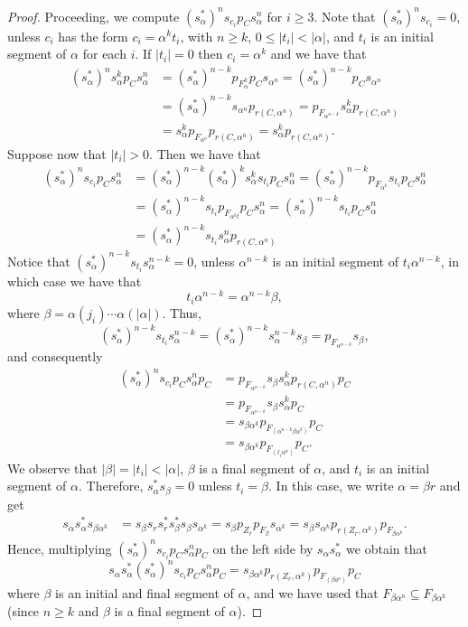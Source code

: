 \documentclass[a4paper,12pt]{amsart}
\theoremstyle{definition}
\theoremstyle{remark}
\numberwithin{equation}{section}
\begin{document}
\begin{proof}
Proceeding, we compute $(s_\alpha ^*)^ns_{c_i}p_C s_{\alpha}^n$ for $i\geq 3$. Note that $(s_\alpha ^*)^ns_{c_i}=0$, unless $c_i$ has the form $c_i=\alpha^k t_i$, with $n \geq k$, $0\leq |t_i|<|\alpha|$, and $t_i$ is an initial segment of $\alpha$ for each $i$. 
If $|t_i|=0$ then $c_i=\alpha^k$ and we have that
\begin{align*} (s_\alpha^*)^ns_\alpha^kp_C s_\alpha^n &=(s_\alpha^*)^{n-k}p_{F_{\alpha}^k}p_Cs_{\alpha^n}=(s_\alpha^*)^{n-k}p_Cs_{\alpha^n}\\
& =(s_\alpha^*)^{n-k}s_{\alpha^n}p_{r(C,\alpha^n)} = p_{F_{\alpha^{n-k}}}s_{\alpha}^kp_{r(C,\alpha^n)} \\
&= s_\alpha^k p_{F_{\alpha^n}}p_{r(C,\alpha^n)}=s_\alpha^k p_{r(C,\alpha^n)}.
\end{align*}
Suppose now that $|t_i|>0$. Then we have that
\begin{align*}
 (s_\alpha^*)^ns_{c_i}p_Cs_\alpha^n &=(s_\alpha^*)^{n-k}(s_\alpha^*)^k s_\alpha^k s_{t_i} p_C s_\alpha^n=(s_\alpha^*)^{n-k} p_{F_{\alpha^k}} s_{t_i} p_C s_\alpha^n\\
 &=(s_\alpha^*)^{n-k} s_{t_i} p_{F_{\alpha^k t}} p_C s_\alpha^n=(s_\alpha^*)^{n-k} s_{t_i} p_C s_\alpha^n\\
 &=(s_\alpha^*)^{n-k} s_{t_i}  s_\alpha^n p_{r(C, \alpha^n)}
\end{align*}
Notice that $(s_{\alpha}^*)^{n-k} s_{t_i} s_\alpha^{n-k}=0$, unless $\alpha^{n-k}$ is an initial segment of $t_i\alpha^{n-k}$, in which case we have that $$t_i \alpha^{n-k}=\alpha^{n-k} \beta,$$ where $\beta=\alpha(j_i)\cdots\alpha(|\alpha|)$. Thus,
$$(s_{\alpha}^*)^{n-k} s_{t_i} s_\alpha^{n-k}=
(s_{\alpha}^*)^{n-k} s_\alpha^{n-k}s_{\beta}=
 p_{F_{\alpha^{n-k}}} s_{\beta},$$
and consequently
\begin{align*}
(s_\alpha^*)^ns_{c_i}p_Cs_\alpha^n p_C&=p_{F_{\alpha^{n-k}}}s_{\beta}s_{\alpha}^kp_{r(C,\alpha^n)}p_C  \\
&=p_{F_{\alpha^{n-k}}}s_{\beta}s_{\alpha}^k p_C\\
&=s_{\beta \alpha^k}p_{F_{(\alpha^{n-k}\beta \alpha^k)}}p_C\\
&=s_{\beta \alpha^k}p_{F_{(t_i \alpha^n)}}p_C.
\end{align*}
We observe that $|\beta|=|t_i|<|\alpha|$, $\beta$ is a final segment of $\alpha$, and $t_i$ is an initial segment of $\alpha$.  
Therefore, $s_\alpha^* s_\beta=0$ unless $t_i=\beta$. In this case, we write $\alpha=\beta r$ and get 
\begin{align*}
s_\alpha s_\alpha^* s_{\beta \alpha^k}&=s_\beta s_r s_r^* s_\beta^* s_\beta s_{\alpha^k}=s_\beta p_{Z_r} p_{F_{\beta}} s_{\alpha^k}=s_\beta s_{\alpha^k}p_{r(Z_r,\alpha^k)}p_{F_{\beta\alpha^k}}.
\end{align*}
Hence, multiplying $(s_\alpha^*)^ns_{c_i}p_Cs_\alpha^n p_C$ on the left side by $s_\alpha s_\alpha^*$ we obtain that
$$s_\alpha s_\alpha^*(s_\alpha^*)^ns_{c_i}p_Cs_\alpha^n p_C= s_{\beta\alpha^k}p_{r(Z_r,\alpha^k)}p_{F_{(\beta a^n)}}p_C$$ where $\beta$ is an initial and final segment of $\alpha$, and we have used that $F_{\beta \alpha^n}\subseteq F_{\beta \alpha^k}$ (since $n\geq k$ and $\beta$ is a final segment of $\alpha$). 


\end{proof}
\end{document}
